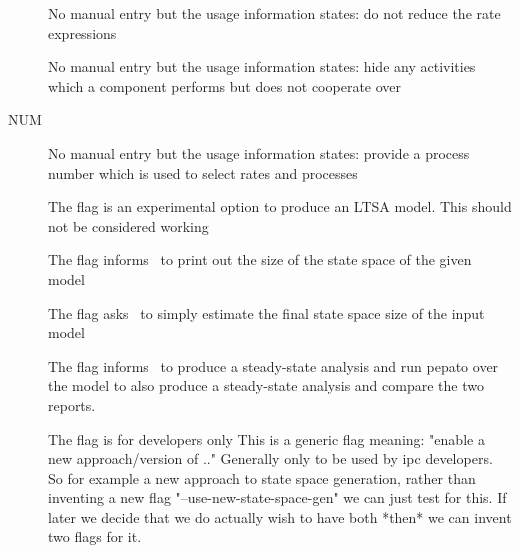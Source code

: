 \begin{description}
\item[ ]
No manual entry but the usage information states:
do not reduce the rate expressions
\end{description}

\begin{description}
\item[ ]
No manual entry but the usage information states:
hide any activities which a component performs but does not cooperate over
\end{description}

\begin{description}
\item[ NUM]
No manual entry but the usage information states:
provide a process number which is used to select rates and processes
\end{description}

\begin{description}
\item[ ]
The  flag is an experimental option to produce
an LTSA model. This should not be considered working

\end{description}

\begin{description}
\item[ ]
The flag  informs \commandNameIpcSmc\ to
print out the size of the state space of the given model

\end{description}

\begin{description}
\item[ ]
The flag  asks \commandNameIpcSmc\ to simply
estimate the final state space size of the input model

\end{description}

\begin{description}
\item[ ]
The flag  informs \commandNameIpcSmc\ to
produce a steady-state analysis and run pepato over
the model to also produce a steady-state analysis and
compare the two reports.

\end{description}

\begin{description}
\item[ ]
The flag  is for developers only
This is a generic flag meaning:
"enable a new approach/version of .."
Generally only to be used by ipc developers.
So for example a new approach to state space generation,
rather than inventing a new flag
"--use-new-state-space-gen" we can just test for this.
If later we decide that we do actually wish to have both
*then* we can invent two flags for it.

\end{description}



